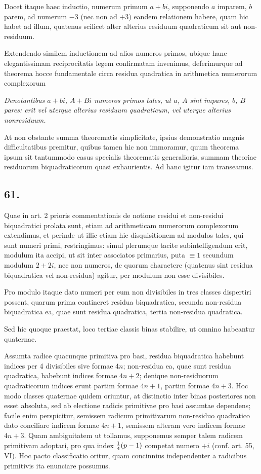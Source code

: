 \documentclass[twoside,12pt]{memoir}
\let\oldfrac\frac
\def\frac#1#2{\mathchoice{\tfrac{#1}{#2}}{\oldfrac{#1}{#2}}{\genfrac{}{}{}{2}{#1}{#2\mathstrut}}{\genfrac{}{}{}{3}{#1}{#2\mathstrut}}}
\begin{document}
Docet itaque haec inductio, numerum primum \(a+b i\), supponendo \(a\) imparem, \(b\) parem, ad numerum \(-3\) (nec non ad \(+3\)) eandem relationem habere, quam hic habet ad illum, quatenus scilicet alter alterius residuum quadraticum sit aut non-residuum.

Extendendo similem inductionem ad alios numeros primos, ubique hanc elegantissimam reciprocitatis legem confirmatam invenimus, deferimurque ad theorema hocce fundamentale circa residua quadratica in arithmetica numerorum complexorum
 
\textit{Denotantibus \(a+b i\), \( A+B i\) numeros primos tales, ut \(a\), \(A\) sint impares, \(b\), \( B\) pares: erit vel uterque alterius residuum quadraticum, vel uterque alterius nonresiduum.}
 
At non obstante summa theorematis simplicitate, ipsius demonstratio magnis difficultatibus premitur, quibus tamen hic non immoramur, quum theorema ipsum sit tantummodo casus specialis theorematis generalioris, summam theoriae residuorum biquadraticorum quasi exhaurientis. Ad hanc igitur iam transeamus.

\subsection*{61.}
 
Quae in art. 2 prioris commentationis de notione residui et non-residui biquadratici prolata sunt, etiam ad arithmeticam numerorum complexorum extendimus, et perinde ut illic etiam hic disquisitionem ad modulos tales, qui sunt numeri primi, restringimus: simul plerumque tacite subintelligendum erit, modulum ita accipi, ut sit inter associatos primarius, puta \(\equiv 1\) secundum modulum \(2+2 i\), nec non numeros, de quorum charactere (quatenus sint residua biquadratica vel non-residua) agitur, per modulum non esse divisibiles.
 
Pro modulo itaque dato numeri per eum non divisibiles in tres classes dispertiri possent, quarum prima contineret residua biquadratica, secunda non-residua biquadratica ea, quae sunt residua quadratica, tertia non-residua quadratica.\pagebreak%

Sed hic quoque praestat, loco tertiae classis binas stabilire, ut omnino habeantur quaternae.
 
Assumta radice quacunque primitiva pro basi, residua biquadratica habebunt indices per 4 divisibiles sive formae \(4 n\); non-residua ea, quae sunt residua quadratica, habebunt indices formae \(4 n+2\); denique non-residuorum quadraticorum indices erunt partim formae \(4 n+1\), partim formae \(4 n+3\). Hoc modo classes quaternae quidem oriuntur, at distinctio inter binas posteriores non esset absoluta, sed ab electione radicis primitivae pro basi assumtae dependens; facile enim perspicitur, semissem radicum primitivarum non-residuo quadratico dato conciliare indicem formae \(4 n+1\), semissem alteram vero indicem formae \(4 n+3\). Quam ambiguitatem ut tollamus, supponemus semper talem radicem primitivam adoptari, pro qua index \(\frac{1}{4}(p-1)\) competat numero \(+i\) (conf. art. 55, VI). Hoc pacto classificatio oritur, quam concinnius independenter a radicibus primitivis ita enunciare possumus.
 
\end{document}
